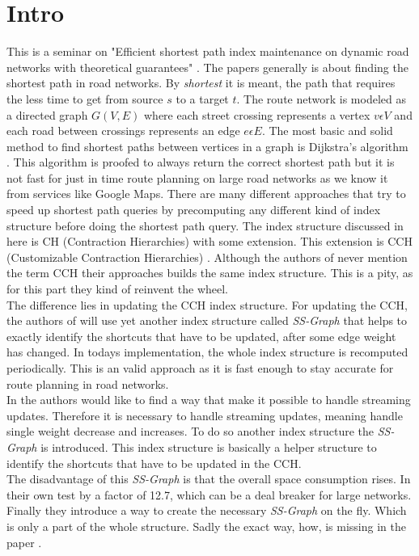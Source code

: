 \documentclass[twocolumn]{article}
\begin{document}


\section{Intro}

This is a seminar on "Efficient shortest path index maintenance on dynamic
road networks with theoretical guarantees" \cite{Ouyang2020}. The papers generally is
about finding the shortest path in road networks. By \textit{shortest} it is meant,
the path that requires the less time to get from source $s$ to a target $t$. The route
network is modeled as a directed graph $G(V,E)$ where each street crossing represents a
vertex $v \epsilon V$ and each road between crossings represents an edge $e \epsilon E$.
The most basic and solid method to find shortest paths between vertices in a graph is
Dijkstra's algorithm \cite{Dijkstra1959}. This algorithm is proofed to always return the
correct shortest path but it is not fast for just in time route planning on large
road networks as we know it from services like Google Maps. There are many
different approaches that try to speed up shortest path queries by precomputing 
any different kind of index structure before doing the shortest path query. The index 
structure discussed in here \cite{Ouyang2020} is CH (Contraction Hierarchies)\cite{Geisberger}
with some extension. This extension is CCH (Customizable Contraction Hierarchies) 
\cite{Dibbelt2014}. Although the authors of \cite{Ouyang2020} never mention the term
CCH their approaches builds the same index structure. This is a pity, as for this part 
they kind of reinvent the wheel. 
\\
The difference lies in updating 
the CCH index structure. For updating the CCH, the authors of \cite{Ouyang2020} will use yet another
index structure called \textit{SS-Graph} that helps to exactly identify the shortcuts that
have to be updated, after some edge weight has changed. In todays implementation, the whole
index structure is recomputed periodically. This is an valid approach as it is fast enough 
to stay accurate for route planning in road networks.
\\
In \cite{Ouyang2020} the authors would like to find a way that make it possible to handle streaming
updates. Therefore it is necessary to handle streaming updates, meaning handle single weight decrease
and increases. To do so another index structure the \textit{SS-Graph} is introduced.
This index structure is basically a helper structure to identify the shortcuts
that have to be updated in the CCH. 
\\
The disadvantage of this \textit{SS-Graph} is that the overall space consumption rises.
In their own test by a factor of 12.7, which can be a deal breaker for large networks.
Finally they introduce a way to create the necessary \textit{SS-Graph} on the fly. Which 
is only a part of the whole structure. 
Sadly the exact way, how, is missing in the paper \cite{Ouyang2020}.
\end{document}
